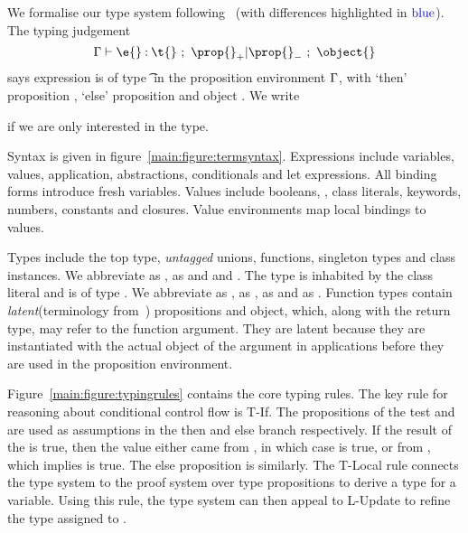 We formalise our type system following~\citet{TF10}
(with differences highlighted in $\mathbin{\textcolor{blue}{\text{blue}}}$).
The typing judgement 
$$
{\judgement   {\propenv}
              {\hastype {\e{}} {\t{}}}
  {\filterset {\thenprop {\prop{}}}
              {\elseprop {\prop{}}}}
  {\object{}}}
$$
says expression \e{} is of type \t{} in the 
proposition environment $\Gamma{}$, with 
`then' proposition {\thenprop {\prop{}}}, `else' proposition {\elseprop {\prop{}}}
and object \object{}. We write 
{\judgementtwo{\propenv}{\hastype {\e{}} {\t{}}} if we are only interested in the type.

Syntax is given in figure~\ref{main:figure:termsyntax}. Expressions include variables, values,
application, abstractions, conditionals and let expressions.
All binding forms introduce fresh variables.
Values include booleans, \nil{}, class literals, keywords, 
numbers,
constants and closures. 
Value environments map local bindings to values.

Types include the top type, \emph{untagged} unions, functions, singleton types
and class instances. 
We abbreviate \Booleanlong{} as \Boolean{}, \Keywordlong{} as \Keyword{}
and \NumberFull{} and \Number{}.
The type \Value{\Keyword} is inhabited by the class literal \Keyword{} and  is of type \Keyword{}.
We abbreviate \EmptyUnion{} as \Bot{}, {\ValueNil} as \Nil{}, 
{\ValueTrue} as \True and {\ValueFalse} as {\False}.
Function types contain \emph{latent}(terminology from~\cite{Lucassen88polymorphiceffect}) propositions and object, which, along with the return type,
may refer to the function argument.
They are latent because they are instantiated with the
actual object of the argument in applications before they are used in the proposition environment.

Figure~\ref{main:figure:typingrules} contains the core typing rules.
The key rule for reasoning about conditional control flow is
T-If. The propositions of the test  and 
are used as assumptions in the then and else branch respectively.
If the result of the \ifliteral{} is true, then the value either
came from , in which case  is true, or from ,
which implies  is true. 
The else proposition is  
similarly.
The T-Local rule connects the type system to the proof system over type propositions
to derive a type for a variable.
Using this rule, the type system can then appeal to L-Update to refine the type
assigned to \x{}.

}
